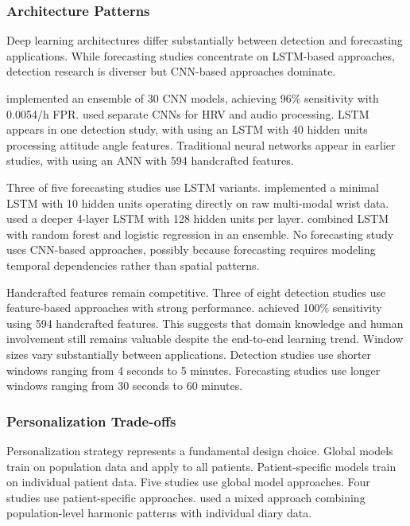 \subsubsection{Architecture Patterns}

Deep learning architectures differ substantially between detection and forecasting applications. While forecasting studies concentrate on LSTM-based approaches, detection research is diverser but CNN-based approaches dominate. 

\textcite{spahrDeepLearningbasedDetection2025} implemented an ensemble of 30 CNN models, achieving 96\% sensitivity with 0.0054/h FPR. \textcite{elemamAutomatedValidatedTool2025} used separate CNNs for HRV and audio processing. LSTM appears in one detection study, with \textcite{wangEpilepticSeizureDetection2025} using an LSTM with 40 hidden units processing attitude angle features. Traditional neural networks appear in earlier studies, with \textcite{fineDetectionKeyAutomated2025} using an ANN with 594 handcrafted features.

Three of five forecasting studies use LSTM variants. \textcite{meiselMachineLearningWristband2020} implemented a minimal LSTM with 10 hidden units operating directly on raw multi-modal wrist data. \textcite{nasseriAmbulatorySeizureForecasting2021} used a deeper 4-layer LSTM with 128 hidden units per layer. \textcite{stirlingForecastingSeizureLikelihood2021} combined LSTM with random forest and logistic regression in an ensemble. No forecasting study uses CNN-based approaches, possibly because forecasting requires modeling temporal dependencies rather than spatial patterns.

Handcrafted features remain competitive. Three of eight detection studies use feature-based approaches with strong performance. \textcite{fineDetectionKeyAutomated2025} achieved 100\% sensitivity using 594 handcrafted features. This suggests that domain knowledge and human involvement still remains valuable despite the end-to-end learning trend. Window sizes vary substantially between applications. Detection studies use shorter windows ranging from 4 seconds to 5 minutes. Forecasting studies use longer windows ranging from 30 seconds to 60 minutes.

\subsubsection{Personalization Trade-offs}

Personalization strategy represents a fundamental design choice. Global models train on population data and apply to all patients. Patient-specific models train on individual patient data. Five studies use global model approaches. Four studies use patient-specific approaches. \textcite{vielufSeizureMonitoringCombined2025} used a mixed approach combining population-level harmonic patterns with individual diary data.


